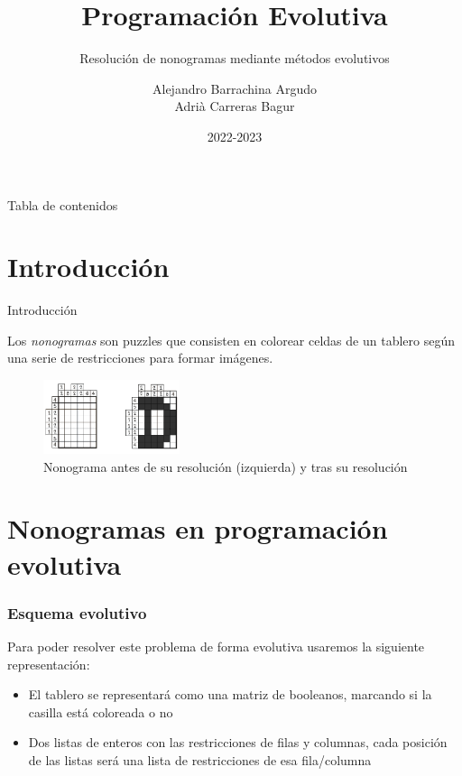 \documentclass{beamer}
\title{Programación Evolutiva}
\subtitle{Resolución de nonogramas mediante métodos evolutivos}
\date{2022-2023}
\author{Alejandro Barrachina Argudo \\ Adrià Carreras Bagur}
\institute{Universidad Complutense de Madrid}
\begin{document}
\maketitle

\begin{frame}{Tabla de contenidos}
    \tableofcontents
\end{frame}

\section{Introducción}
\begin{frame}{Introducción}

    Los \textit{nonogramas} son puzzles que consisten en colorear celdas de un tablero según una serie de restricciones para formar imágenes.

    \begin{figure}
        \centering
        \includegraphics[width=4cm]{Images/nonograma.png}
        \caption{ Nonograma antes de su resolución (izquierda) y tras su resolución}
    \end{figure}

\end{frame}
\section{Nonogramas en programación evolutiva}
\begin{frame}
    \frametitle{Esquema evolutivo}

    Para poder resolver este problema de forma evolutiva usaremos la siguiente representación:
    \begin{itemize}
        \item <1-> El tablero se representará como una matriz de booleanos, marcando si la casilla está coloreada o no
        \item <2-> Dos listas de enteros con las restricciones de filas y columnas, cada posición de las listas será una lista de restricciones de esa fila/columna
    \end{itemize}

\end{frame}
\end{document}
